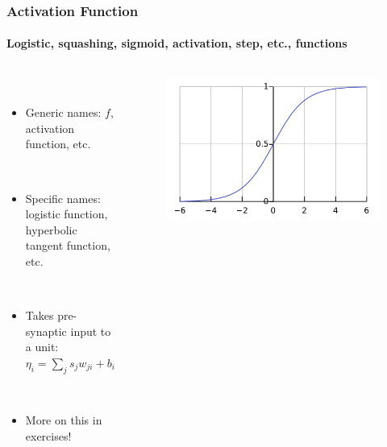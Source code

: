 \documentclass{beamer}
\newcommand{\figheight}{0.72\textheight}
\begin{document}
\begin{frame}[fragile]
\frametitle{Activation Function}
\framesubtitle{Logistic, squashing, sigmoid, activation, step, etc., functions}
 \begin{columns}[T]
    \begin{column}{.45\textwidth} 
             \  \\

     
\begin{itemize}[<+->]

\item Generic  names: $f$, activation function, etc.

\ \\

\item Specific names: logistic function, hyperbolic tangent function, etc.


\ \\

\item Takes pre-synaptic input to a unit:
$ \eta_{i}= \sum_{j} s_jw_{ji} + b_i $


\ \\

\item More on this in exercises! 
 
\end{itemize}
\end{column}
\begin{column}{.55\textwidth}
\begin{figure}[t]
 \begin{flushleft}

 \includegraphics[scale=.4]{fig/Logistic-curve.pdf}


 \end{flushleft}
\end{figure}
\end{column}

\end{columns}
\end{frame}
\end{document}
